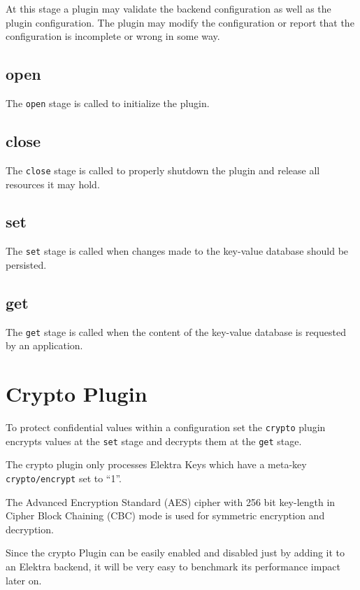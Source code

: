 At this stage a plugin may validate the backend configuration as well as
the plugin configuration. The plugin may modify the configuration or
report that the configuration is incomplete or wrong in some way.

\subsection{open}\label{open}

The \texttt{open} stage is called to initialize the plugin.

\subsection{close}\label{close}

The \texttt{close} stage is called to properly shutdown the plugin and
release all resources it may hold.

\subsection{set}\label{set}

The \texttt{set} stage is called when changes made to the key-value
database should be persisted.

\subsection{get}\label{get}

The \texttt{get} stage is called when the content of the key-value
database is requested by an application.

\section{Crypto Plugin}\label{crypto-plugin}

To protect confidential values within a configuration set the
\texttt{crypto} plugin encrypts values at the \texttt{set} stage and
decrypts them at the \texttt{get} stage.

The crypto plugin only processes Elektra Keys which have a meta-key
\texttt{crypto/encrypt} set to ``1''.

The Advanced Encryption Standard (AES) cipher with 256 bit key-length in
Cipher Block Chaining (CBC) mode is used for symmetric encryption and
decryption.

Since the crypto Plugin can be easily enabled and disabled just by adding it to an Elektra backend,
it will be very easy to benchmark its performance impact later on.

